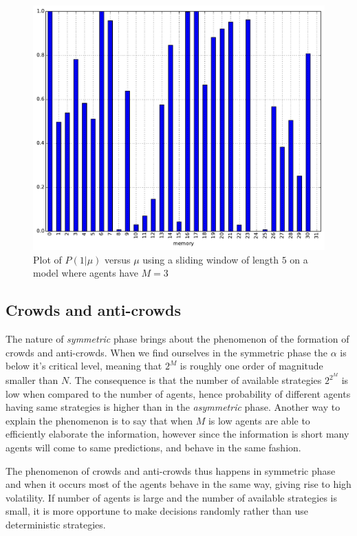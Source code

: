 \begin{figure}[h]
\begin{center}
\includegraphics[scale=0.4]{images/minority/information_probability_m3_a5.pdf}
\caption{Plot of $P(1|\mu)$ versus $\mu$ using a sliding window of length $5$ on a model where agents have $M=3$}
\label{fig:information_35}
\end{center}
\end{figure}

\subsection{Crowds and anti-crowds}
\label{subsec:crowds}

The nature of \textit{symmetric} phase brings about the phenomenon of the formation of crowds and anti-crowds.
When we find ourselves in the symmetric phase the $\alpha$ is below it's critical level, meaning that $2^M$ is roughly one order of magnitude smaller than $N$.
The consequence is that the number of available strategies $2^{2^M}$ is low when compared to the number of agents, hence probability of different agents having same strategies is higher than in the \textit{asymmetric} phase.
Another way to explain the phenomenon is to say that when $M$ is low agents are able to efficiently elaborate the information, however since the information is short many agents will come to same predictions, and behave in the same fashion.

The phenomenon of crowds and anti-crowds thus happens in symmetric phase and when it occurs most of the agents behave in the same way, giving rise to high volatility.
If number of agents is large and the number of available strategies is small, it is more opportune to make decisions randomly rather than use deterministic strategies.

